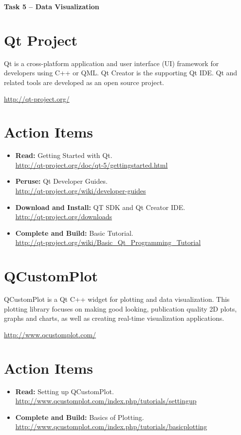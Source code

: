 \documentclass[11pt]{article}
\begin{document}
\begin{center}
{\bfseries \LARGE Task 5 -- Data Visualization\\[8mm]}
\end{center}


\section{Qt Project}

Qt is a cross-platform application and user interface (UI) framework for developers using C++ or QML.
Qt Creator is the supporting Qt IDE.
Qt and related tools are developed as an open source project.

\begin{center}
\url{http://qt-project.org/}
\end{center}


\section*{Action Items}

\begin{itemize}
\item \textbf{Read:} Getting Started with Qt. \\
\url{http://qt-project.org/doc/qt-5/gettingstarted.html}
\item \textbf{Peruse:} Qt Developer Guides. \\
\url{http://qt-project.org/wiki/developer-guides}
\item \textbf{Download and Install:} QT SDK and Qt Creator IDE. \\
\url{http://qt-project.org/downloads}
\item \textbf{Complete and Build:} Basic Tutorial. \\
\url{http://qt-project.org/wiki/Basic_Qt_Programming_Tutorial}
\end{itemize}


\section{QCustomPlot}

QCustomPlot is a Qt C++ widget for plotting and data visualization.
This plotting library focuses on making good looking, publication quality 2D plots, graphs and charts, as well as creating real-time visualization applications.
 
\begin{center}
\url{http://www.qcustomplot.com/}
\end{center}


\section*{Action Items}

\begin{itemize}
\item \textbf{Read:} Setting up QCustomPlot. \\
\url{http://www.qcustomplot.com/index.php/tutorials/settingup}
\item \textbf{Complete and Build:} Basics of Plotting. \\
\url{http://www.qcustomplot.com/index.php/tutorials/basicplotting}
\end{itemize}
\end{document}
